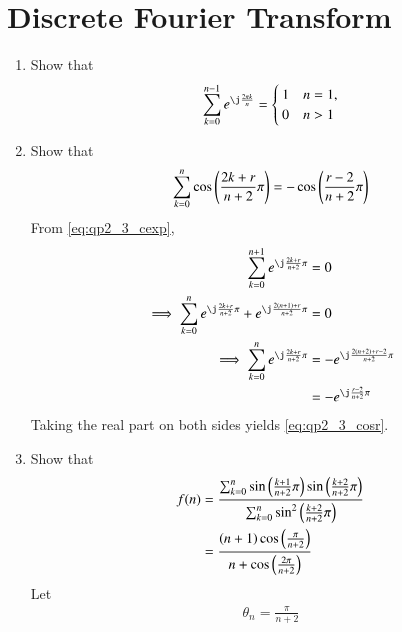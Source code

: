 \section{Discrete Fourier Transform}
\renewcommand{\theequation}{\theenumi}
\begin{enumerate}[label=\arabic*.,ref=\thesubsection.\theenumi]

\item Show that 
\begin{align}
\label{eq:qp2_3_cexp}
\sum_{k=0}^{n-1}e^{\j \frac{2 \pi k}{n}} 
= 
\begin{cases}
1 & n = 1,
\\
0 & n > 1
\end{cases}
\end{align}
\item Show that 
%
\begin{align}
\label{eq:qp2_3_cosr}
\sum_{k=0}^{n}\cos \left(\frac{2k+r}{n+2}\pi\right) = -\cos\left(\frac{r-2}{n+2}\pi\right) 
\end{align}
\solution From \eqref{eq:qp2_3_cexp},
\begin{align}
\label{eq:qp2_3_cosr_sol}
\sum_{k=0}^{n+1}e^{\j \frac{2k+r}{n+2}\pi} &=0
\nonumber \\
\implies \sum_{k=0}^{n}e^{\j \frac{2k+r}{n+2}\pi} + e^{\j \frac{2\brak{n+1}+r}{n+2}\pi} &=0
\nonumber \\
\implies \sum_{k=0}^{n}e^{\j \frac{2k+r}{n+2}\pi} &=  -e^{\j \frac{2\brak{n+2}+r-2}{n+2}\pi} 
\nonumber \\
&=-e^{\j \frac{r-2}{n+2}\pi} 
\end{align}
Taking the real part on both sides yields \eqref{eq:qp2_3_cosr}.
%
\item Show that 
\begin{align}
\label{eq:qp2_3_sum}
f(n) & = \frac{\sum_{k=0}^{n}\sin\left(\frac{k+1}{n+2}\pi\right)
\sin\left(\frac{k+2}{n+2}\pi\right) }{\sum_{k=0}^{n}\sin^2\left(\frac{k+2}{n+2}\pi\right)}
\\
& = 
\frac{\left(n+1\right)\cos \left(\frac{\pi}{n+2}\right)}{n+\cos\left(\frac{2\pi}{n+2}\right)}
\label{eq:qp2_3_sum_ans}
\end{align}
\solution 
Let
\begin{align}
\label{eq:qp2_3_theta}
\theta_n = \frac{\pi}{n+2}
\end{align}
%
\begin{multline}
\label{eq:qp2_3_cos}

\end{multline}
\end{enumerate}
